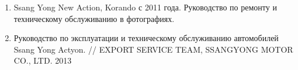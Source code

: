 \begin{enumerate}
%
%
%
%
%
%
%
\item 
Ssang Yong New Action, Korando с 2011 года. Руководство по ремонту и техническому обслуживанию в фотографиях. 
\item 
Руководство по эксплуатации и техническому обслуживанию автомобилей Ssang Yong Actyon. // EXPORT SERVICE TEAM, SSANGYONG MOTOR CO., LTD. 2013


\end{enumerate}
